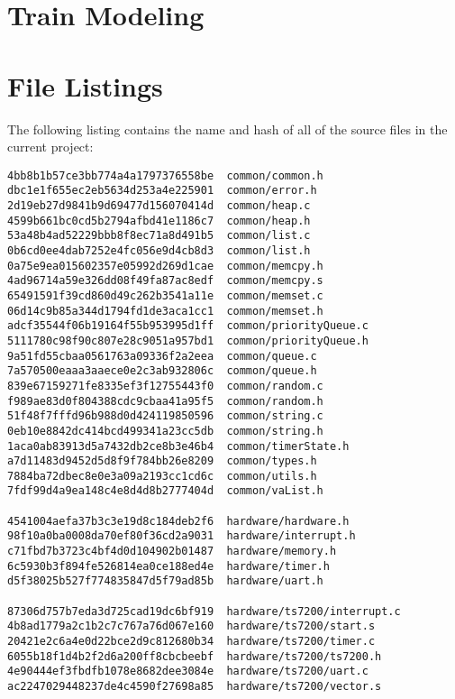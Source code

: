 \documentclass[twoside,a4paper]{refart}
\begin{document}
\section{Train Modeling}

\section{File Listings}
The following listing contains the name and hash of all of the source files in the current project:
\begin{verbatim}
4bb8b1b57ce3bb774a4a1797376558be  common/common.h
dbc1e1f655ec2eb5634d253a4e225901  common/error.h
2d19eb27d9841b9d69477d156070414d  common/heap.c
4599b661bc0cd5b2794afbd41e1186c7  common/heap.h
53a48b4ad52229bbb8f8ec71a8d491b5  common/list.c
0b6cd0ee4dab7252e4fc056e9d4cb8d3  common/list.h
0a75e9ea015602357e05992d269d1cae  common/memcpy.h
4ad96714a59e326dd08f49fa87ac8edf  common/memcpy.s
65491591f39cd860d49c262b3541a11e  common/memset.c
06d14c9b85a344d1794fd1de3aca1cc1  common/memset.h
adcf35544f06b19164f55b953995d1ff  common/priorityQueue.c
5111780c98f90c807e28c9051a957bd1  common/priorityQueue.h
9a51fd55cbaa0561763a09336f2a2eea  common/queue.c
7a570500eaaa3aaece0e2c3ab932806c  common/queue.h
839e67159271fe8335ef3f12755443f0  common/random.c
f989ae83d0f804388cdc9cbaa41a95f5  common/random.h
51f48f7fffd96b988d0d424119850596  common/string.c
0eb10e8842dc414bcd499341a23cc5db  common/string.h
1aca0ab83913d5a7432db2ce8b3e46b4  common/timerState.h
a7d11483d9452d5d8f9f784bb26e8209  common/types.h
7884ba72dbec8e0e3a09a2193cc1cd6c  common/utils.h
7fdf99d4a9ea148c4e8d4d8b2777404d  common/vaList.h

4541004aefa37b3c3e19d8c184deb2f6  hardware/hardware.h
98f10a0ba0008da70ef80f36cd2a9031  hardware/interrupt.h
c71fbd7b3723c4bf4d0d104902b01487  hardware/memory.h
6c5930b3f894fe526814ea0ce188ed4e  hardware/timer.h
d5f38025b527f774835847d5f79ad85b  hardware/uart.h

87306d757b7eda3d725cad19dc6bf919  hardware/ts7200/interrupt.c
4b8ad1779a2c1b2c7c767a76d067e160  hardware/ts7200/start.s
20421e2c6a4e0d22bce2d9c812680b34  hardware/ts7200/timer.c
6055b18f1d4b2f2d6a200ff8cbcbeebf  hardware/ts7200/ts7200.h
4e90444ef3fbdfb1078e8682dee3084e  hardware/ts7200/uart.c
ac2247029448237de4c4590f27698a85  hardware/ts7200/vector.s


\end{verbatim}
\end{document}
